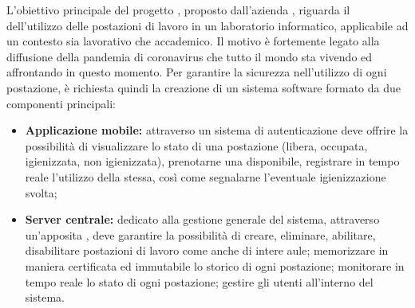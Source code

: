 L'obiettivo principale del progetto \NomeProgetto{}, proposto dall'azienda \proponente{}, riguarda il  dell'utilizzo delle postazioni di lavoro in un laboratorio informatico, applicabile ad un contesto sia lavorativo che accademico.
Il motivo è fortemente legato alla diffusione della pandemia di coronavirus che tutto il mondo sta vivendo ed affrontando in questo momento. Per garantire la sicurezza nell'utilizzo di ogni postazione, è richiesta quindi la creazione di un sistema software formato da due componenti principali:
\begin{itemize}
    \item \textbf{Applicazione mobile:} attraverso un sistema di autenticazione deve offrire la possibilità di visualizzare lo stato di una postazione (libera, occupata, igienizzata, non igienizzata), prenotarne una disponibile, registrare in tempo reale l'utilizzo della stessa, così come segnalarne l'eventuale igienizzazione svolta;
    \item \textbf{Server centrale:} dedicato alla gestione generale del sistema, attraverso un'apposita , deve garantire la possibilità di creare, eliminare, abilitare, disabilitare postazioni di lavoro come anche di intere aule; memorizzare in maniera certificata ed immutabile lo storico di ogni postazione; monitorare in tempo reale lo stato di ogni postazione; gestire gli utenti all'interno del sistema.
\end{itemize}